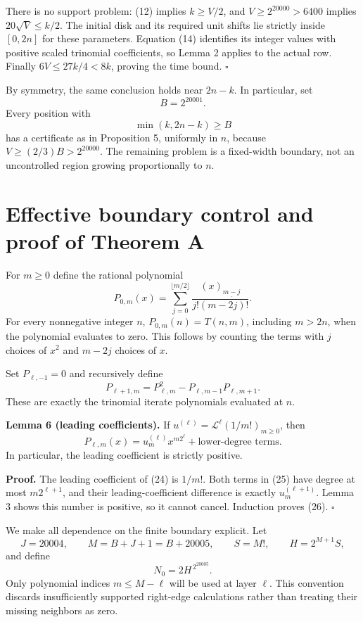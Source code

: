 \documentclass[11pt,a4paper]{article}
\begin{document}
There is no support problem: (12) implies \(k\geq V/2\), and
\(V\geq2^{20000}>6400\) implies \(20\sqrt V\leq k/2\). The initial disk
and its required unit shifts lie strictly inside \([0,2n]\) for these
parameters. Equation (14) identifies its integer values with positive
scaled trinomial coefficients, so Lemma 2 applies to the actual row.
Finally \(6V\leq27k/4<8k\), proving the time bound. \(\square\)

By symmetry, the same conclusion holds near \(2n-k\). In particular, set
\[
 B=2^{20001}.
\] Every position with \[
 \min(k,2n-k)\geq B \tag{23}
\] has a certificate as in Proposition 5, uniformly in \(n\), because
\(V\geq(2/3)B>2^{20000}\). The remaining problem is a fixed-width
boundary, not an uncontrolled region growing proportionally to \(n\).

\section{Effective boundary control and proof of Theorem A}\label{effective-boundary-control-and-proof-of-theorem-a}


For \(m\geq0\) define the rational polynomial \[
 P_{0,m}(x)=\sum_{j=0}^{\lfloor m/2\rfloor}
 \frac{(x)_{\underline{m-j}}}{j!(m-2j)!}. \tag{24}
\] For every nonnegative integer \(n\), \(P_{0,m}(n)=T(n,m)\), including
\(m>2n\), when the polynomial evaluates to zero. This follows by
counting the terms with \(j\) choices of \(x^2\) and \(m-2j\) choices of
\(x\).

Set \(P_{\ell,-1}=0\) and recursively define \[
 P_{\ell+1,m}=P_{\ell,m}^2-P_{\ell,m-1}P_{\ell,m+1}. \tag{25}
\] These are exactly the trinomial iterate polynomials evaluated at
\(n\).

\textbf{Lemma 6 (leading coefficients).} If
\(u^{(\ell)}=\mathcal L^\ell(1/m!)_{m\geq0}\), then \[
 P_{\ell,m}(x)=u^{(\ell)}_m x^{m2^\ell}+\text{lower-degree terms}. \tag{26}
\] In particular, the leading coefficient is strictly positive.

\textbf{Proof.} The leading coefficient of (24) is \(1/m!\). Both terms
in (25) have degree at most \(m2^{\ell+1}\), and their
leading-coefficient difference is exactly \(u^{(\ell+1)}_m\). Lemma 3
shows this number is positive, so it cannot cancel. Induction proves
(26). \(\square\)

We make all dependence on the finite boundary explicit. Let \[
 J=20004,\qquad M=B+J+1=B+20005,\qquad
 S=M!,\qquad H=2^{M+1}S,
\] and define \[
 \boxed{N_0=2H^{\,2^{20005}}.} \tag{27}
\] Only polynomial indices \(m\leq M-\ell\) will be used at layer
\(\ell\). This convention discards insufficiently supported right-edge
calculations rather than treating their missing neighbors as zero.
\end{document}
